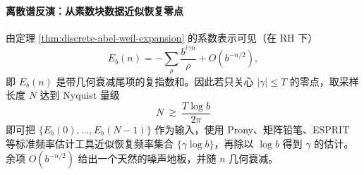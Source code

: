 \paragraph{离散谱反演：从素数块数据近似恢复零点}
由定理 \ref{thm:discrete-abel-weil-expansion} 的系数表示可见（在 RH 下）
\[
E_b(n)=-\sum_{\rho}\frac{b^{i\gamma n}}{\rho}+O(b^{-n/2}),
\]
即 \(E_b(n)\) 是带几何衰减尾项的复指数和。因此若只关心 \(|\gamma|\le T\) 的零点，取采样长度 \(N\) 达到 Nyquist 量级
\[
N\ \gtrsim\ \frac{T\log b}{2\pi}
\]
即可把 \(\{E_b(0),\dots,E_b(N-1)\}\) 作为输入，使用 Prony、矩阵铅笔、ESPRIT 等标准频率估计工具近似恢复频率集合 \(\{\gamma\log b\}\)，再除以 \(\log b\) 得到 \(\gamma\) 的估计。余项 \(O(b^{-n/2})\) 给出一个天然的噪声地板，并随 \(n\) 几何衰减。
